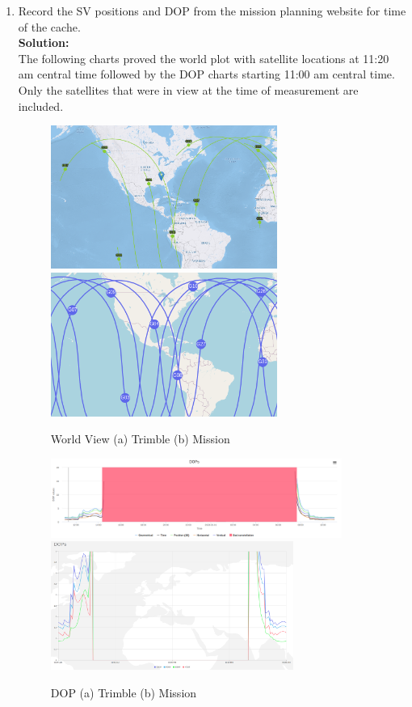 \documentclass[11pt]{article}
\newcommand{\solution}{\textbf{\\Solution: \\}}
\begin{document}
\begin{enumerate}[label=\textbf{\arabic*.}]
  \item Record the SV positions and DOP from the mission planning website for 
  time of the cache.
  \solution
  The following charts proved the world plot with satellite locations at 
  11:20 am central time followed by the DOP charts starting 11:00 am 
  central time. Only the satellites that were in view at the time of 
  measurement are included.
  \begin{figure}[H]
    \centering
    \includegraphics[width=0.7\textwidth]{trimble_world.png}
    \includegraphics[width=0.7\textwidth]{mission_world.png}
    \caption{World View (a) Trimble (b) Mission}
  \end{figure}
  \begin{figure}[H]
    \centering
    \includegraphics[width=0.9\textwidth]{trimble_dop.png}
    \includegraphics[width=0.75\textwidth]{mission_dop.png}
    \caption{DOP (a) Trimble (b) Mission}
  \end{figure}

\end{enumerate}
\end{document}
